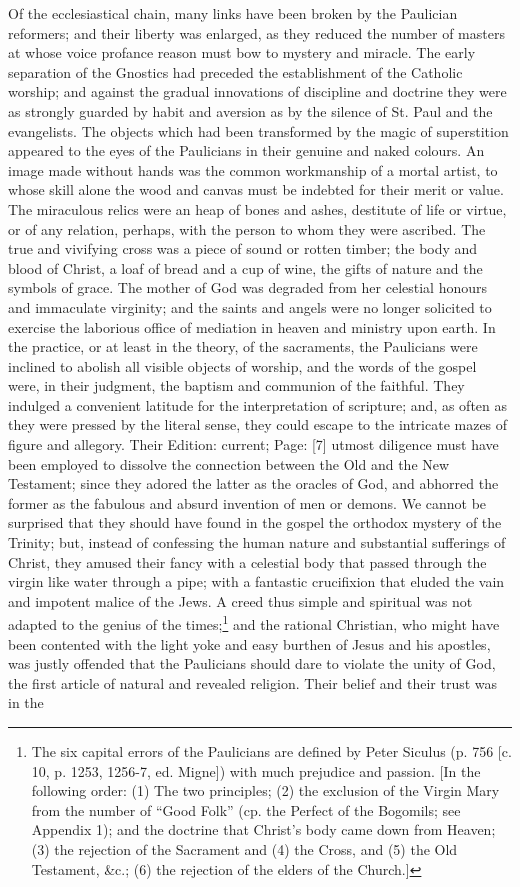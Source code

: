Of the ecclesiastical chain, many links have been broken by the Paulician reformers; and their liberty was enlarged, as they reduced the number of masters at whose voice profance reason must bow to mystery and miracle. The early separation of the Gnostics had preceded the establishment of the Catholic worship; and against the gradual innovations of discipline and doctrine they were as strongly guarded by habit and aversion as by the silence of St. Paul and the evangelists. The objects which had been transformed by the magic of superstition appeared to the eyes of the Paulicians in their genuine and naked colours. An image made without hands was the common workmanship of a mortal artist, to whose skill alone the wood and canvas must be indebted for their merit or value. The miraculous relics were an heap of bones and ashes, destitute of life or virtue, or of any relation, perhaps, with the person to whom they were ascribed. The true and vivifying cross was a piece of sound or rotten timber; the body and blood of Christ, a loaf of bread and a cup of wine, the gifts of nature and the symbols of grace. The mother of God was degraded from her celestial honours and immaculate virginity; and the saints and angels were no longer solicited to exercise the laborious office of mediation in heaven and ministry upon earth. In the practice, or at least in the theory, of the sacraments, the Paulicians were inclined to abolish all visible objects of worship, and the words of the gospel were, in their judgment, the baptism and communion of the faithful. They indulged a convenient latitude for the interpretation of scripture; and, as often as they were pressed by the literal sense, they could escape to the intricate mazes of figure and allegory. Their Edition: current; Page: [7] utmost diligence must have been employed to dissolve the connection between the Old and the New Testament; since they adored the latter as the oracles of God, and abhorred the former as the fabulous and absurd invention of men or demons. We cannot be surprised that they should have found in the gospel the orthodox mystery of the Trinity; but, instead of confessing the human nature and substantial sufferings of Christ, they amused their fancy with a celestial body that passed through the virgin like water through a pipe; with a fantastic crucifixion that eluded the vain and impotent malice of the Jews. A creed thus simple and spiritual was not adapted to the genius of the times;\footnote{The six capital errors of the Paulicians are defined by Peter Siculus (p. 756 [c. 10, p. 1253, 1256-7, ed. Migne]) with much prejudice and passion. [In the following order: (1) The two principles; (2) the exclusion of the Virgin Mary from the number of \texthebrew{“}Good Folk\texthebrew{}” (cp. the Perfect of the Bogomils; see Appendix 1); and the doctrine that Christ\texthebrew{}’s body came down from Heaven; (3) the rejection of the Sacrament and (4) the Cross, and (5) the Old Testament, \&c.; (6) the rejection of the elders of the Church.]} and the rational Christian, who might have been contented with the light yoke and easy burthen of Jesus and his apostles, was justly offended that the Paulicians should dare to violate the unity of God, the first article of natural and revealed religion. Their belief and their trust was in the 